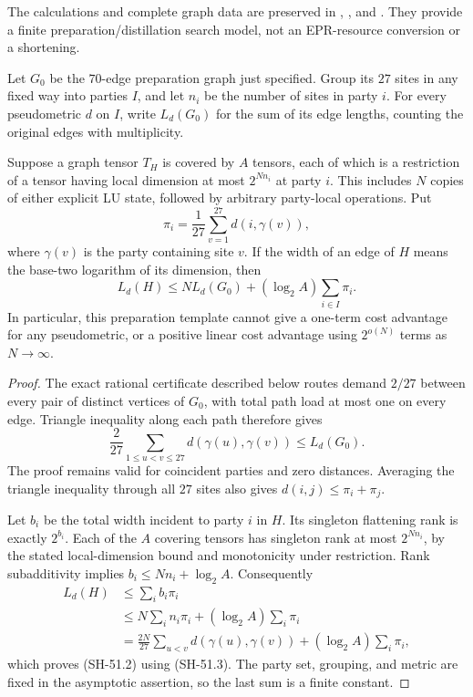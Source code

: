 The calculations and complete graph data are preserved in
,
, and
.
They provide a finite preparation/distillation search model,
not an EPR-resource conversion or a shortening.

\begin{proposition}
\label{prop:lu-standard-preparation-obstruction}
Let $G_0$ be the $70$-edge preparation graph just specified.
Group its $27$ sites in any fixed way into parties $I$, and
let $n_i$ be the number of sites in party $i$.  For every
pseudometric $d$ on $I$, write $L_d(G_0)$ for the sum of its
edge lengths, counting the original edges with multiplicity.

Suppose a graph tensor $T_H$ is covered by $A$ tensors,
each of which is a restriction of a tensor having local
dimension at most $2^{Nn_i}$ at party $i$.  This includes
$N$ copies of either explicit LU state, followed by arbitrary
party-local operations.  Put
\[
 \pi_i=\frac1{27}\sum_{v=1}^{27}d(i,\gamma(v)),
                                                        \tag{SH-51.1}
\]
where $\gamma(v)$ is the party containing site $v$.
If the width of an edge of $H$ means the base-two logarithm
of its dimension, then
\[
 L_d(H)\le N L_d(G_0)+(\log_2 A)\sum_{i\in I}\pi_i.
                                                        \tag{SH-51.2}
\]
In particular, this preparation template cannot give a
one-term cost advantage for any pseudometric, or a positive
linear cost advantage using $2^{o(N)}$ terms as $N\to\infty$.
\end{proposition}
\begin{proof}
The exact rational certificate described below routes demand
$2/27$ between every pair of distinct vertices of $G_0$,
with total path load at most one on every edge.
Triangle inequality along each path therefore gives
\[
 \frac2{27}\sum_{1\le u<v\le27}d(\gamma(u),\gamma(v))
       \le L_d(G_0).                                  \tag{SH-51.3}
\]
The proof remains valid for coincident parties and zero
distances.  Averaging the triangle inequality through all
$27$ sites also gives $d(i,j)\le\pi_i+\pi_j$.

Let $b_i$ be the total width incident to party $i$ in $H$.
Its singleton flattening rank is exactly $2^{b_i}$.
Each of the $A$ covering tensors has singleton rank at most
$2^{Nn_i}$, by the stated local-dimension bound and monotonicity
under restriction.  Rank subadditivity implies
$b_i\le Nn_i+\log_2 A$.  Consequently
\begin{align*}
 L_d(H)&\le\sum_i b_i\pi_i\\
       &\le N\sum_i n_i\pi_i+(\log_2 A)\sum_i\pi_i\\
       &=\frac{2N}{27}\sum_{u<v}d(\gamma(u),\gamma(v))
                     +(\log_2 A)\sum_i\pi_i,
\end{align*}
which proves (SH-51.2) using (SH-51.3).
The party set, grouping, and metric are fixed in the
asymptotic assertion, so the last sum is a finite constant.
\end{proof}

